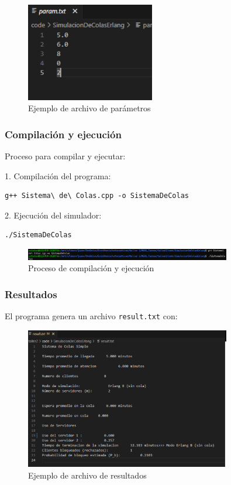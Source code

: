\documentclass{article}
\begin{document}
\begin{figure}[H]
    \centering
    \includegraphics[width=0.5\textwidth]{images/manualUsuarioErlangBC_3.png}
    \caption{Ejemplo de archivo de parámetros}
    \label{fig:parametros}
\end{figure}

\subsubsection{Compilación y ejecución}
Proceso para compilar y ejecutar:

1. Compilación del programa:
\begin{verbatim}
g++ Sistema\ de\ Colas.cpp -o SistemaDeColas
\end{verbatim}

2. Ejecución del simulador:
\begin{verbatim}
./SistemaDeColas
\end{verbatim}

\begin{figure}[H]
    \centering
    \includegraphics[width=0.8\textwidth]{images/manualUsuarioErlangBC_4.png}
    \caption{Proceso de compilación y ejecución}
    \label{fig:compilacion}
\end{figure}

\subsubsection{Resultados}
El programa genera un archivo \texttt{result.txt} con:

\begin{figure}[H]
    \centering
    \includegraphics[width=0.8\textwidth]{images/manualUsuarioErlangBC_5.png}
    \caption{Ejemplo de archivo de resultados}
    \label{fig:resultados}
\end{figure}
\end{document}
